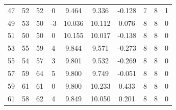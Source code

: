 \begin{table}[t]
\begin{tabular}{cccccccccc}
47 & 52 & 52 & 0 & 9.464 & 9.336 & -0.128 & 7 & 8 & 1 \\
49 & 53 & 50 & -3 & 10.036 & 10.112 & 0.076 & 8 & 8 & 0 \\
51 & 50 & 50 & 0 & 10.155 & 10.017 & -0.138 & 8 & 8 & 0 \\
53 & 55 & 59 & 4 & 9.844 & 9.571 & -0.273 & 8 & 8 & 0 \\
55 & 54 & 57 & 3 & 9.801 & 9.532 & -0.269 & 8 & 8 & 0 \\
57 & 59 & 64 & 5 & 9.800 & 9.749 & -0.051 & 8 & 8 & 0 \\
59 & 61 & 61 & 0 & 9.800 & 10.233 & 0.433 & 8 & 8 & 0 \\
61 & 58 & 62 & 4 & 9.849 & 10.050 & 0.201 & 8 & 8 & 0 \\
\hline
\end{tabular}
\end{table}
